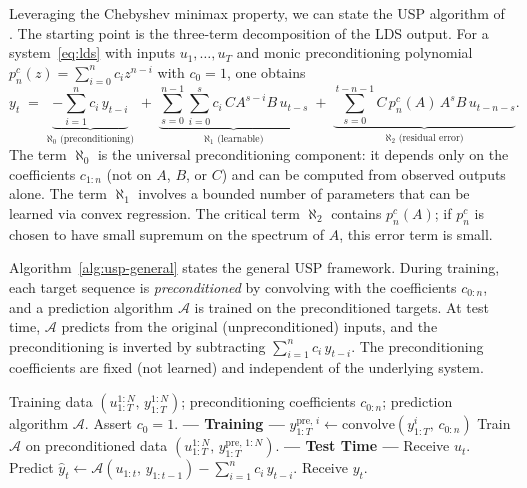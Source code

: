 \documentclass[11pt]{article}
\theoremstyle{plain}
\theoremstyle{definition}
\theoremstyle{remark}
\begin{document}
Leveraging the Chebyshev minimax property, we can state the USP algorithm of \citet{marsden2024universal}. The starting point is the three-term decomposition of the LDS output. For a system~\eqref{eq:lds} with inputs $u_1, \ldots, u_T$ and monic preconditioning polynomial $p_n^c(z) = \sum_{i=0}^{n} c_i z^{n-i}$ with $c_0 = 1$, one obtains
\begin{equation}
    y_t \;=\; \underbrace{-\sum_{i=1}^{n} c_i\, y_{t-i}}_{\aleph_0\text{ (preconditioning)}}
    \;+\; \underbrace{\sum_{s=0}^{n-1} \sum_{i=0}^{s} c_i\, C A^{s-i} B\, u_{t-s}}_{\aleph_1\text{ (learnable)}}
    \;+\; \underbrace{\sum_{s=0}^{t-n-1} C\, p_n^c(A)\, A^s B\, u_{t-n-s}}_{\aleph_2\text{ (residual error)}}.
    \label{eq:three-term}
\end{equation}
The term $\aleph_0$ is the universal preconditioning component: it depends only on the coefficients $c_{1:n}$ (not on $A$, $B$, or $C$) and can be computed from observed outputs alone. The term $\aleph_1$ involves a bounded number of parameters that can be learned via convex regression. The critical term $\aleph_2$ contains $p_n^c(A)$; if $p_n^c$ is chosen to have small supremum on the spectrum of $A$, this error term is small.

Algorithm~\ref{alg:usp-general} states the general USP framework. During training, each target sequence is \emph{preconditioned} by convolving with the coefficients $c_{0:n}$, and a prediction algorithm $\mathcal{A}$ is trained on the preconditioned targets. At test time, $\mathcal{A}$ predicts from the original (unpreconditioned) inputs, and the preconditioning is inverted by subtracting $\sum_{i=1}^{n} c_i\, y_{t-i}$. The preconditioning coefficients are fixed (not learned) and independent of the underlying system.

\begin{algorithm}[t]
\caption{General Sequence Preconditioning \citep[Alg.~1]{marsden2024universal}}
\label{alg:usp-general}
\begin{algorithmic}[1]
\REQUIRE Training data $(u^{1:N}_{1:T},\, y^{1:N}_{1:T})$; preconditioning coefficients $c_{0:n}$; prediction algorithm $\mathcal{A}$.
\STATE Assert $c_0 = 1$.
\STATE \textbf{--- Training ---}
    \STATE $y^{\mathrm{pre},\,i}_{1:T} \leftarrow \mathrm{convolve}(y^{i}_{1:T},\, c_{0:n})$ 
\ENDFOR
\STATE Train $\mathcal{A}$ on preconditioned data $(u^{1:N}_{1:T},\, y^{\mathrm{pre},\,1:N}_{1:T})$.
\STATE \textbf{--- Test Time ---}
    \STATE Receive $u_t$.
    \STATE Predict $\hat y_t \leftarrow \mathcal{A}(u_{1:t},\, y_{1:t-1}) - \sum_{i=1}^{n} c_i\, y_{t-i}$.
    \STATE Receive $y_t$.
\ENDFOR
\end{algorithmic}
\end{algorithm}
\end{document}
